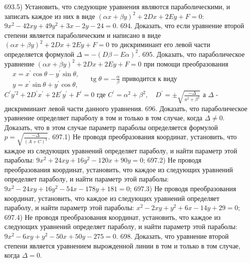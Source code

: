 693.5) Установить, что следующие уравнения являются параболическими, и записать каждое из них в виде $(\alpha x+\beta y)^2+2 D x+2 E y+F=0$: $9 x^2-42 x y+49 y^2+3 x-2 y-24=0$.
694. Доказать, что если уравнение второй степени является параболическим и написано в виде $(\alpha x+\beta y)^2+2 D x+2 E y+F=0$ то дискриминант его левой части определяется формулой $\Delta=-(D \beta-E \alpha)^2$.
695. Доказать, что параболическое уравнение $(\alpha x+\beta y)^2+2 D x+2 E y+F=0$ при помощи преобразования $\begin{aligned}& x=x^{\prime} \cos \theta-y^{\prime} \sin \theta, \\& y=x^{\prime} \sin \theta+y^{\prime} \cos \theta,\end{aligned} \quad \operatorname{tg} \theta=-\frac{\alpha}{\beta}$ приводится к виду $C^{\prime} y^{\prime 2}+2 D^{\prime} x^{\prime}+2 E^{\prime} y^{\prime}+F^{\prime}=0$ где $C^{\prime}=\alpha^2+\beta^2, \quad D^{\prime}= \pm \sqrt{\frac{-\Delta}{a^2+\beta^2}}$ а $\Delta$ - дискриминант левой части данного уравнения.
696. Доказать, что параболическое уравнение определяет параболу в том и только в том случае, когда $\Delta \neq 0$. Доказать, что в этом случае параметр параболы определяется формулой $p=\sqrt{\frac{-\Delta}{(A+C)^3}}$.
697.1) Не проводя преобразования координат, установить, что каждое из следующих уравнений определяет параболу, и найти параметр этой параболы: $9 x^2+24 x y+16 y^2-120 x+90 y=0$;
697.2) Не проводя преобразования координат, установить, что каждое из следующих уравнений определяет параболу, и найти параметр этой параболы: $9 x^2-24 x y+16 y^2-54 x-178 y+181=0$;
697.3) Не проводя преобразования координат, установить, что каждое из следующих уравнений определяет параболу, и найти параметр этой параболы: $x^2-2 x y+y^2+6 x-14 y+29=0$;
697.4) Не проводя преобразования координат, установить, что каждое из следующих уравнений определяет параболу, и найти параметр этой параболы: $9 x^2-6 x y+y^2-50 x+50 y-275=0$.
698. Доказать, что уравнение второй степени является уравнением вырожденной линии в том и только в том случае, когда $\Delta=0$.